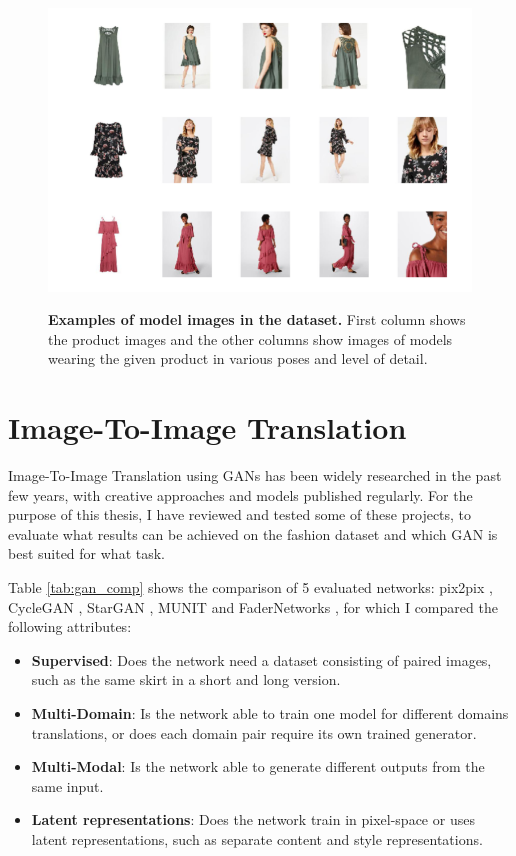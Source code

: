 \documentclass[12pt]{report}
\begin{document}
\begin{figure}[h]
\centering
{\includegraphics[width=\linewidth]{03_analysis/data/model_images}}
\caption{\label{fig:models} \textbf{Examples of model images in the dataset.} First column shows the product images and the other columns show images of models wearing the given product in various poses and level of detail.}
\end{figure}

\pagebreak
\section{Image-To-Image Translation}
Image-To-Image Translation using GANs has been widely researched in the past few years, with creative approaches and models published regularly. For the purpose of this thesis, I have reviewed and tested some of these projects, to evaluate what results can be achieved on the fashion dataset and which GAN is best suited for what task.

Table \ref{tab:gan_comp} shows the comparison of 5 evaluated networks: pix2pix \cite{isola_image--image_2016}, CycleGAN \cite{zhu_unpaired_2017}, StarGAN \cite{choi_stargan_2017}, MUNIT \cite{huang_multimodal_2018} and FaderNetworks \cite{lample_fader_2017}, for which I compared the following attributes:
\begin{itemize}
\item \textbf{Supervised}: Does the network need a dataset consisting of paired images, such as the same skirt in a short and long version.
\item \textbf{Multi-Domain}: Is the network able to train one model for different domains translations, or does each domain pair require its own trained generator.
\item \textbf{Multi-Modal}: Is the network able to generate different outputs from the same input.
\item \textbf{Latent representations}: Does the network train in pixel-space or uses latent representations, such as separate content and style representations.
\end{itemize}
\end{document}
